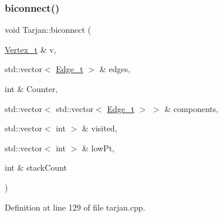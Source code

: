 \subsubsection{\texorpdfstring{biconnect()}{biconnect()}}
{\footnotesize\ttfamily void Tarjan\+::biconnect (\begin{DoxyParamCaption}\item[{\hyperlink{class_graph_component_ae67114a6ce5a001dc35e1996e1b45aa0}{Vertex\+\_\+t} \&}]{v,  }\item[{std\+::vector$<$ \hyperlink{utilities_8h_af4a84c740ebb77e6a13a00aa289b0018}{Edge\+\_\+t} $>$ \&}]{edges,  }\item[{int \&}]{Counter,  }\item[{std\+::vector$<$ std\+::vector$<$ \hyperlink{utilities_8h_af4a84c740ebb77e6a13a00aa289b0018}{Edge\+\_\+t} $>$ $>$ \&}]{components,  }\item[{std\+::vector$<$ int $>$ \&}]{visited,  }\item[{std\+::vector$<$ int $>$ \&}]{low\+Pt,  }\item[{int \&}]{stack\+Count }\end{DoxyParamCaption})}



Definition at line 129 of file tarjan.\+cpp.


